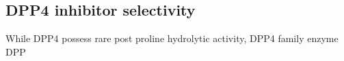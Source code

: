 \subsection{DPP4 inhibitor selectivity}
While DPP4 possess rare post proline hydrolytic activity, DPP4 family enzyme DPP
